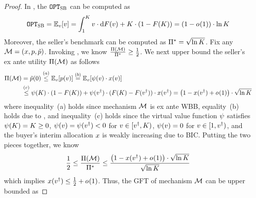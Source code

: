 \begin{proof}
    In , the {\SecondBest} $\texttt{OPT}_{\textsc{SB}}$ can be computed as
    \begin{align*}
        \OPTSB = \expect[\val]{\val} =
        \displaystyle\int_1^{\constantH} \val\cdot \d \buyercdf(\val)
        + \constantH\cdot (1 - \buyercdf(\constantH))
        =
        (1 - o_{}(1))\cdot \ln \constantH
    \end{align*}
    Moreover, the seller's benchmark can be computed as $
        \Pi^* = \sqrt{\ln K}$.
    Fix any {\NashSocialWelfareMaximizer} $\mathcal{M} = (x,p,\tilde{p})$. Invoking , we know $
        \frac{\Pi(\mathcal{M})}{\Pi^*} \geq \frac{1}{2}$.
    We next upper bound the seller's ex ante utility $\Pi(\mathcal{M})$ as follows
    \begin{align*}
        \sellerexanteutil(\mech) &{} = 
        \sellerprice(0) \overset{(a)}{\leq} 
        \expect[\val]{\price(\val)}
        \overset{(b)}{=}
        \expect[\val]{\virtualval(\val)\cdot \alloc(\val)}
        \\
        &{} 
        \overset{(c)}{\leq} 
        \virtualval(\constantH)\cdot (1 - \buyercdf(\constantH))
        +
        \virtualval(\val\primed)\cdot (\buyercdf(\constantH) - \buyercdf(\val\primed)) \cdot \alloc(\val\primed)
        =
        \left(1 - \alloc(\val\primed) + o_{}(1)\right)\cdot \sqrt{\ln\constantH}
    \end{align*}
    where inequality~(a) holds since mechanism $\mathcal{M}$ is ex ante WBB, 
    equality~(b) holds due to , and
    inequality~(c) holds since the virtual value function $\psi$ satisfies $\psi(K) = K \geq 0$, $\psi(v) = \psi(v^\dagger) < 0$ for $v\in[v^\dagger,K)$, $\psi(v) = 0$ for $v\in[1, v^\dagger)$, and the buyer's interim allocation $x$ is weakly increasing due to BIC. Putting the two pieces together, we know 
    \begin{align*}
        \frac{1}{2} \leq \frac{\Pi(\mathcal{M})}{\Pi^*}
        \leq \frac{        \left(1 - x(v^\dagger) + o_{}(1)\right)\cdot \sqrt{\ln K}}{\sqrt{\ln K}}
    \end{align*}
    which implies $x(v^\dagger) \leq \frac{1}{2} + o_{}(1)$. Thus, the GFT of mechanism $\mathcal{M}$ can be upper bounded as 

\end{proof}
